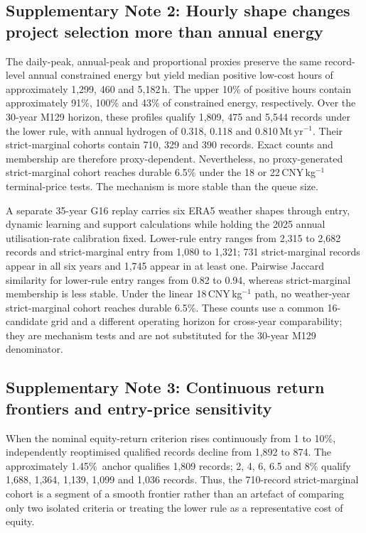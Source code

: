 \documentclass[11pt,a4paper]{article}
\newcommand{\lowhurdle}{approximately 1.45\%}
\begin{document}
\subsection*{Supplementary Note 2: Hourly shape changes project selection more than annual energy}

The daily-peak, annual-peak and proportional proxies preserve the same record-level annual constrained energy but yield median positive low-cost hours of approximately 1,299, 460 and 5,182\,h. The upper 10\% of positive hours contain approximately 91\%, 100\% and 43\% of constrained energy, respectively. Over the 30-year M129 horizon, these profiles qualify 1,809, 475 and 5,544 records under the lower rule, with annual hydrogen of 0.318, 0.118 and 0.810\,Mt\,yr$^{-1}$. Their strict-marginal cohorts contain 710, 329 and 390 records. Exact counts and membership are therefore proxy-dependent. Nevertheless, no proxy-generated strict-marginal cohort reaches durable 6.5\% under the 18 or 22\,CNY\,kg$^{-1}$ terminal-price tests. The mechanism is more stable than the queue size.

A separate 35-year G16 replay carries six ERA5 weather shapes through entry, dynamic learning and support calculations while holding the 2025 annual utilisation-rate calibration fixed. Lower-rule entry ranges from 2,315 to 2,682 records and strict-marginal entry from 1,080 to 1,321; 731 strict-marginal records appear in all six years and 1,745 appear in at least one. Pairwise Jaccard similarity for lower-rule entry ranges from 0.82 to 0.94, whereas strict-marginal membership is less stable. Under the linear 18\,CNY\,kg$^{-1}$ path, no weather-year strict-marginal cohort reaches durable 6.5\%. These counts use a common 16-candidate grid and a different operating horizon for cross-year comparability; they are mechanism tests and are not substituted for the 30-year M129 denominator.

\subsection*{Supplementary Note 3: Continuous return frontiers and entry-price sensitivity}

When the nominal equity-return criterion rises continuously from 1 to 10\%, independently reoptimised qualified records decline from 1,892 to 874. The \lowhurdle\ anchor qualifies 1,809 records; 2, 4, 6, 6.5 and 8\% qualify 1,688, 1,364, 1,139, 1,099 and 1,036 records. Thus, the 710-record strict-marginal cohort is a segment of a smooth frontier rather than an artefact of comparing only two isolated criteria or treating the lower rule as a representative cost of equity.
\end{document}
